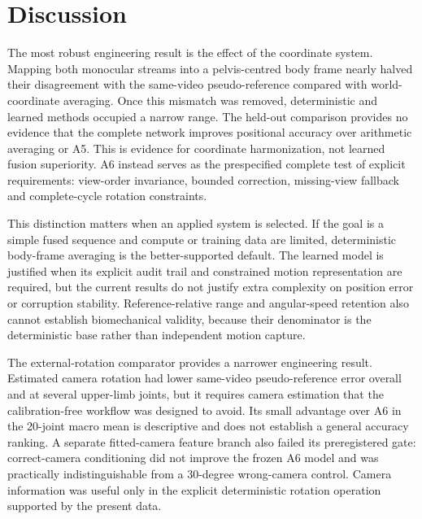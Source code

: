 \documentclass[lineno,pdflatex,sn-mathphys-num]{sn-jnl}
\begin{document}
\section{Discussion}\label{sec:discussion}

The most robust engineering result is the effect of the coordinate system.
Mapping both monocular streams into a pelvis-centred body frame nearly halved
their disagreement with the same-video pseudo-reference compared with
world-coordinate averaging. Once this mismatch was removed, deterministic and
learned methods occupied a narrow range. The held-out comparison provides no
evidence that the complete network improves positional accuracy over arithmetic
averaging or A5. This is evidence for coordinate harmonization, not learned
fusion superiority. A6 instead serves as the prespecified complete test of
explicit requirements: view-order invariance, bounded correction, missing-view
fallback and complete-cycle rotation constraints.

This distinction matters when an applied system is selected. If the goal is a
simple fused sequence and compute or training data are limited, deterministic
body-frame averaging is the better-supported default. The learned model is
justified when its explicit audit trail and constrained motion representation
are required, but the current results do not justify extra complexity on
position error or corruption stability. Reference-relative range and
angular-speed retention also cannot establish biomechanical validity, because
their denominator is the deterministic base rather than independent motion
capture.

The external-rotation comparator provides a narrower engineering result.
Estimated camera rotation had lower same-video pseudo-reference error overall
and at several upper-limb joints, but it requires camera estimation
that the calibration-free workflow was designed to avoid. Its small advantage
over A6 in the 20-joint macro mean is descriptive and does not establish a
general accuracy ranking. A separate fitted-camera feature branch also failed
its preregistered gate: correct-camera conditioning did not improve the frozen
A6 model and was practically indistinguishable from a 30-degree wrong-camera
control. Camera information was useful only in the explicit deterministic
rotation operation supported by the present data.
\end{document}
